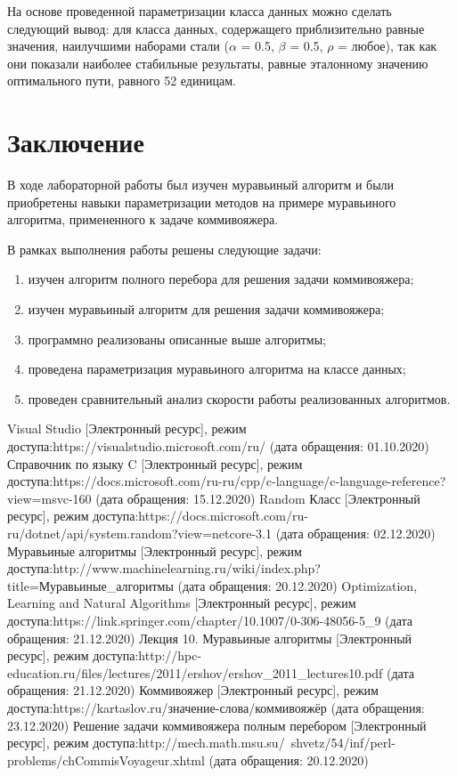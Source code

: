 \documentclass[12pt]{report}
\begin{document}
На основе проведенной параметризации класса данных можно сделать следующий вывод: для класса данных, содержащего приблизительно равные значения, наилучшими наборами стали ($\alpha$ = 0.5, $\beta$ = 0.5, $\rho$ = любое), так как они показали наиболее стабильные результаты, равные эталонному значению оптимального пути, равного 52 единицам.

\chapter*{Заключение}

В ходе лабораторной работы был изучен муравьиный алгоритм и были приобретены навыки параметризации методов на примере муравьиного алгоритма, примененного к задаче коммивояжера.

В рамках выполнения работы решены следующие задачи:

\begin{enumerate}
\item изучен алгоритм полного перебора для решения задачи коммивояжера;
\item  изучен муравьиный алгоритм для решения задачи коммивояжера;
\item программно реализованы описанные выше алгоритмы;
\item проведена параметризация муравьиного алгоритма на классе данных;
\item проведен сравнительный анализ скорости работы реализованных алгоритмов.
\end{enumerate}

%
%

\begin{thebibliography}{3}
	Visual Studio [Электронный ресурс], режим доступа:https://visualstudio.microsoft.com/ru/ (дата обращения: 01.10.2020)
	Справочник по языку C [Электронный ресурс], режим доступа:https://docs.microsoft.com/ru-ru/cpp/c-language/c-language-reference?view=msvc-160 (дата обращения: 15.12.2020)
	Random Класс [Электронный ресурс], режим доступа:https://docs.microsoft.com/ru-ru/dotnet/api/system.random?view=netcore-3.1 (дата обращения: 02.12.2020)
	Муравьиные алгоритмы [Электронный ресурс], режим доступа:http://www.machinelearning.ru/wiki/index.php?title=Муравьиные\_алгоритмы (дата обращения: 20.12.2020)
	Optimization, Learning and Natural Algorithms [Электронный ресурс], режим доступа:https://link.springer.com/chapter/10.1007/0-306-48056-5\_9 (дата обращения: 21.12.2020)
	Лекция 10. Муравьиные алгоритмы [Электронный ресурс], режим доступа:http://hpc-education.ru/files/lectures/2011/ershov/ershov\_2011\_lectures10.pdf (дата обращения: 21.12.2020)
	Коммивояжер [Электронный ресурс], режим доступа:https://kartaslov.ru/значение-слова/коммивояжёр (дата обращения: 23.12.2020)
	Решение задачи коммивояжера полным перебором [Электронный ресурс], режим доступа:http://mech.math.msu.su/~shvetz/54/inf/perl-problems/chCommisVoyageur.xhtml (дата обращения: 20.12.2020)
	
	
\end{thebibliography}
\end{document}
